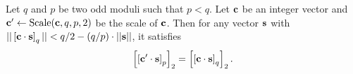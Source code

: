 \documentclass[../main.tex]{subfiles}
\begin{document}
\begin{lemma}
\label{lm:modSwitch}
\reversemarginpar
{}
Let $q$ and $p$ be two odd moduli such that $p<q$. Let $\mathbf{c}$ be an integer vector and $\mathbf{c}' \leftarrow \text{Scale}(\mathbf{c},q,p,2)$ be the scale of $\mathbf{c}$. Then for any vector $\mathbf{s}$ with $||\left[{\mathbf{c} \cdot \mathbf{s}}\right]_q|| < q/2 - (q/p) \cdot ||\mathbf{s}||$, it satisfies 
\begin{align*}
    \sqbracket{\sqbracket{\vc{c}' \cdot \vc{s}}_p}_2  = \sqbracket{\sqbracket{\vc{c} \cdot \vc{s}}_q}_2. %
\end{align*}
\end{lemma}   
 
\end{document}
